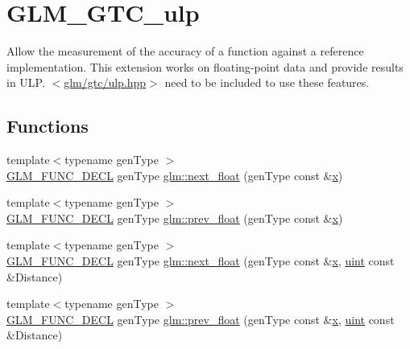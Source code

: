 \hypertarget{group__gtc__ulp}{}\section{G\+L\+M\+\_\+\+G\+T\+C\+\_\+ulp}
\label{group__gtc__ulp}


Allow the measurement of the accuracy of a function against a reference implementation. This extension works on floating-\/point data and provide results in U\+LP. $<$\mbox{\hyperlink{ulp_8hpp}{glm/gtc/ulp.\+hpp}}$>$ need to be included to use these features.  


\subsection*{Functions}
\begin{DoxyCompactItemize}
\item 
{\footnotesize template$<$typename gen\+Type $>$ }\\\mbox{\hyperlink{setup_8hpp_ab2d052de21a70539923e9bcbf6e83a51}{G\+L\+M\+\_\+\+F\+U\+N\+C\+\_\+\+D\+E\+CL}} gen\+Type \mbox{\hyperlink{group__gtc__ulp_gae516ae554faa6117660828240e8bdaf0}{glm\+::next\+\_\+float}} (gen\+Type const \&\mbox{\hyperlink{glad_8h_a92d0386e5c19fb81ea88c9f99644ab1d}{x}})
\item 
{\footnotesize template$<$typename gen\+Type $>$ }\\\mbox{\hyperlink{setup_8hpp_ab2d052de21a70539923e9bcbf6e83a51}{G\+L\+M\+\_\+\+F\+U\+N\+C\+\_\+\+D\+E\+CL}} gen\+Type \mbox{\hyperlink{group__gtc__ulp_ga2fcbb7bfbfc595712bfddc51b0715b07}{glm\+::prev\+\_\+float}} (gen\+Type const \&\mbox{\hyperlink{glad_8h_a92d0386e5c19fb81ea88c9f99644ab1d}{x}})
\item 
{\footnotesize template$<$typename gen\+Type $>$ }\\\mbox{\hyperlink{setup_8hpp_ab2d052de21a70539923e9bcbf6e83a51}{G\+L\+M\+\_\+\+F\+U\+N\+C\+\_\+\+D\+E\+CL}} gen\+Type \mbox{\hyperlink{group__gtc__ulp_gad107ec3d9697ef82032a33338a73ebdd}{glm\+::next\+\_\+float}} (gen\+Type const \&\mbox{\hyperlink{glad_8h_a92d0386e5c19fb81ea88c9f99644ab1d}{x}}, \mbox{\hyperlink{group__core__precision_ga4fd29415871152bfb5abd588334147c8}{uint}} const \&Distance)
\item 
{\footnotesize template$<$typename gen\+Type $>$ }\\\mbox{\hyperlink{setup_8hpp_ab2d052de21a70539923e9bcbf6e83a51}{G\+L\+M\+\_\+\+F\+U\+N\+C\+\_\+\+D\+E\+CL}} gen\+Type \mbox{\hyperlink{group__gtc__ulp_gaa399d5b6472a70e8952f9b26ecaacdec}{glm\+::prev\+\_\+float}} (gen\+Type const \&\mbox{\hyperlink{glad_8h_a92d0386e5c19fb81ea88c9f99644ab1d}{x}}, \mbox{\hyperlink{group__core__precision_ga4fd29415871152bfb5abd588334147c8}{uint}} const \&Distance)

\end{DoxyCompactItemize}
